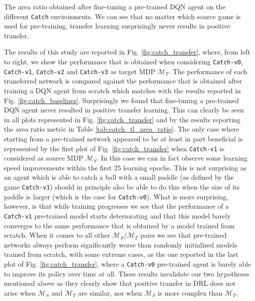 \begin{table}[ht!]
	\centering
	\caption{The area ratio obtained after fine-tuning a pre-trained DQN agent on the different \texttt{Catch} environments. We can see that no matter which source game is used for pre-training, transfer learning surprisingly never results in positive transfer.}
	
	\label{tab:catch_tl_area_ratio}
\end{table}
The results of this study are reported in Fig. \ref{fig:catch_transfer}, where, from left to right, we show the performance that is obtained when considering \texttt{Catch-v0}, \texttt{Catch-v1}, \texttt{Catch-v2} and \texttt{Catch-v3} as target MDP $\mathcal{M}_T$. The performance of each transferred network is compared against the performance that is obtained after training a DQN agent from scratch which matches with the results reported in Fig. \ref{fig:catch_baselines}.
Surprisingly we found that fine-tuning a pre-trained DQN agent never resulted in positive transfer learning. This can clearly be seen in all plots represented in Fig. \ref{fig:catch_transfer} and by the results reporting the area ratio metric in Table \ref{tab:catch_tl_area_ratio}. The only case where starting from a pre-trained network appeared to be at least in part beneficial is represented by the first plot of Fig. \ref{fig:catch_transfer} when \texttt{Catch-v1} is considered as source MDP $\mathcal{M}_S$. In this case we can in fact observe some learning speed improvements within the first $25$ learning epochs. This is not surprising as an agent which is able to catch a ball with a small paddle (as defined by the game \texttt{Catch-v1}) should in principle also be able to do this when the size of its paddle is larger (which is the case for \texttt{Catch-v0}). What is more surprising, however, is that while training progresses we see that the performance of a \texttt{Catch-v1} pre-trained model starts deteriorating and that this model barely converges to the same performance that is obtained by a model trained from scratch. When it comes to all other $\mathcal{M}_S/\mathcal{M}_T$ pairs we see that pre-trained networks always perform significantly worse than randomly initialized models trained from scratch, with some extreme cases, as the one reported in the last plot of Fig. \ref{fig:catch_transfer}, where a \texttt{Catch-v0} pre-trained agent is barely able to improve its policy over time at all. These results invalidate our two hypotheses mentioned above as they clearly show that positive transfer in DRL does not arise when $\mathcal{M}_S$ and $\mathcal{M}_T$ are similar, nor when $\mathcal{M}_S$ is more complex than $\mathcal{M}_T$. 


